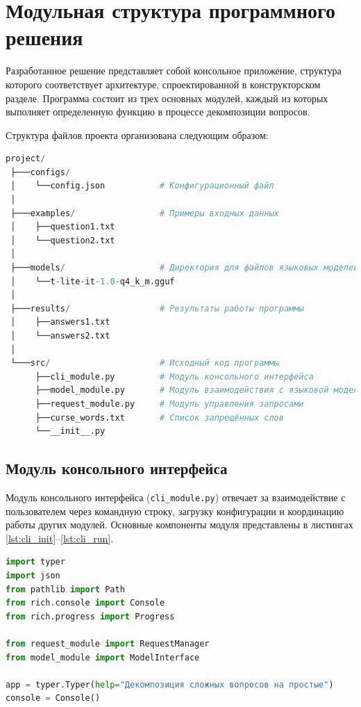 \section{Модульная структура программного решения}

Разработанное решение представляет собой консольное приложение, структура которого соответствует архитектуре, спроектированной в конструкторском разделе. Программа состоит из трех основных модулей, каждый из которых выполняет определенную функцию в процессе декомпозиции вопросов.

Структура файлов проекта организована следующим образом:
\begin{lstlisting}[caption={Файловая структура проекта}, label=lst:project_struct, language=Python]
 project/
 ├───configs/
 │    └──config.json           # Конфигурационный файл
 │       
 ├───examples/                 # Примеры входных данных
 │    ├──question1.txt
 │    └──question2.txt
 │       
 ├───models/                   # Директория для файлов языковых моделей
 │    └──t-lite-it-1.0-q4_k_m.gguf
 │       
 ├───results/                  # Результаты работы программы
 │    ├──answers1.txt
 │    └──answers2.txt
 │       
 └───src/                      # Исходный код программы
	  ├──cli_module.py         # Модуль консольного интерфейса
 	  ├──model_module.py       # Модуль взаимодействия с языковой моделью
 	  ├──request_module.py     # Модуль управления запросами
 	  ├──curse_words.txt       # Список запрещённых слов
 	  └──__init__.py
\end{lstlisting}

\subsection{Модуль консольного интерфейса}

Модуль консольного интерфейса (\texttt{cli\_module.py}) отвечает за взаимодействие с пользователем через командную строку, загрузку конфигурации и координацию работы других модулей. Основные компоненты модуля представлены в листингах \ref{lst:cli_init}--\ref{lst:cli_run}.

\begin{lstlisting}[caption={Инициализация консольного приложения}, label=lst:cli_init, language=Python]
import typer
import json
from pathlib import Path
from rich.console import Console
from rich.progress import Progress

from request_module import RequestManager
from model_module import ModelInterface

app = typer.Typer(help="Декомпозиция сложных вопросов на простые")
console = Console()
\end{lstlisting}

